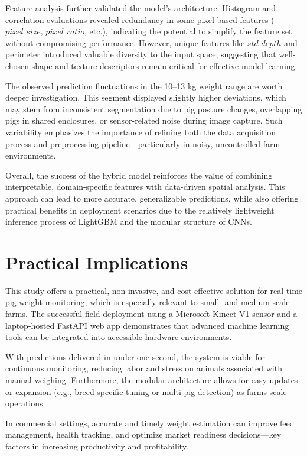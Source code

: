 Feature analysis further validated the model’s architecture. Histogram and correlation evaluations revealed redundancy in some pixel-based features ($pixel\_size$, $pixel\_ratio$, etc.), indicating the potential to simplify the feature set without compromising performance. However, unique features like $std\_depth$ and perimeter introduced valuable diversity to the input space, suggesting that well-chosen shape and texture descriptors remain critical for effective model learning.

The observed prediction fluctuations in the 10–13 kg weight range are worth deeper investigation. This segment displayed slightly higher deviations, which may stem from inconsistent segmentation due to pig posture changes, overlapping pigs in shared enclosures, or sensor-related noise during image capture. Such variability emphasizes the importance of refining both the data acquisition process and preprocessing pipeline—particularly in noisy, uncontrolled farm environments.

Overall, the success of the hybrid model reinforces the value of combining interpretable, domain-specific features with data-driven spatial analysis. This approach can lead to more accurate, generalizable predictions, while also offering practical benefits in deployment scenarios due to the relatively lightweight inference process of LightGBM and the modular structure of CNNs.

\section{Practical Implications}

This study offers a practical, non-invasive, and cost-effective solution for real-time pig weight monitoring, which is especially relevant to small- and medium-scale farms. The successful field deployment using a Microsoft Kinect V1 sensor and a laptop-hosted FastAPI web app demonstrates that advanced machine learning tools can be integrated into accessible hardware environments.

With predictions delivered in under one second, the system is viable for continuous monitoring, reducing labor and stress on animals associated with manual weighing. Furthermore, the modular architecture allows for easy updates or expansion (e.g., breed-specific tuning or multi-pig detection) as farms scale operations.

In commercial settings, accurate and timely weight estimation can improve feed management, health tracking, and optimize market readiness decisions—key factors in increasing productivity and profitability.

